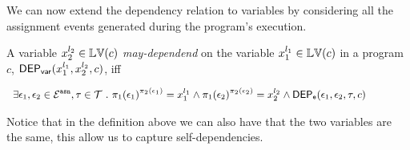 We can now extend the dependency relation to variables by considering all the assignment events generated during the program’s execution. 

\begin{defn}
  \label{def:var_dep}
A variable ${x}_2^{l_2} \in \mathbb{LV}(c)$  \emph{may-dependend} on the 
  variable ${x}_1^{l_1} \in \mathbb{LV}(c)$ in a program ${c}$,
  $\mathsf{DEP_{var}}({x}_1^{l_1}, {x}_2^{l_2}, {c})$, iff
\begin{center}
$
{\small   \begin{array}{l}
\exists \event_1, \event_2 \in \eventset^{\asn}, \trace \in \mathcal{T} \st
\pi_{1}{(\event_1)}^{\pi_{2}{(\event_1)}} = {x}_1^{l_1}
\land
\pi_{1}{(\event_2)}^{\pi_{2}{(\event_2)}} = {x}_2^{l_2}%
\land 
\eventdep(\event_1, \event_2, \trace, c) 
  \end{array}
}%
$
\end{center}
  \end{defn}
Notice that in the definition above we can also have that the two variables are the same, this allow us to capture self-dependencies.




